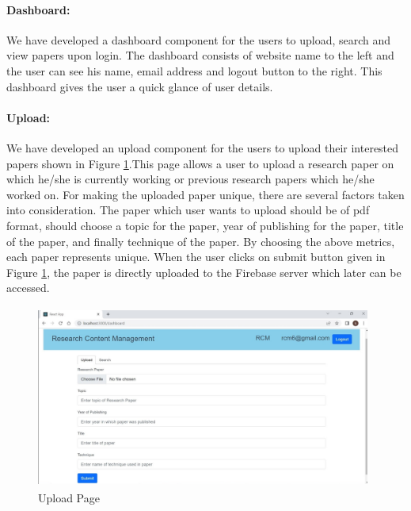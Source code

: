 \paragraph{\textbf{Dashboard:}} We have developed a dashboard component for the users to upload, search and view papers upon login. The dashboard consists of website name to the left and the user can see his name, email address and logout button to the right. This dashboard gives the user a quick glance of user details.

\paragraph{\textbf{Upload:}} We have developed an upload component for the users to upload their interested papers shown in Figure \ref{fig:upload}.This page allows a user to upload a research paper on which he/she is currently working or previous research papers which he/she worked on. For making the uploaded paper unique, there are several factors taken into consideration. The paper which user wants to upload should be of pdf format, should choose a topic for the paper, year of publishing for the paper, title of the paper, and finally technique of the paper. By choosing the above metrics, each paper represents unique. When the user clicks on submit button given in Figure \ref{fig:upload}, the paper is directly uploaded to the Firebase server which later can be accessed.
\begin{figure}[h]
	\centering
	\includegraphics[width=11cm,height=6cm]{./images/upload.png}
	\vspace{-0.5cm}
	\caption{Upload Page}
	\label{fig:upload}
\end{figure}

